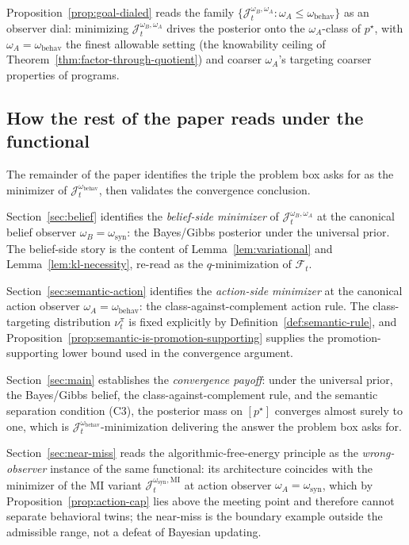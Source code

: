 \documentclass[11pt]{article}
\theoremstyle{definition}
\theoremstyle{remark}
\begin{document}
Proposition~\ref{prop:goal-dialed} reads the family $\{\mathcal J_t^{\omega_B,\omega_A}:\omega_A\le\omega_{\mathrm{behav}}\}$ as an observer dial: minimizing $\mathcal J_t^{\omega_B,\omega_A}$ drives the posterior onto the $\omega_A$-class of $p^\star$, with $\omega_A=\omega_{\mathrm{behav}}$ the finest allowable setting (the knowability ceiling of Theorem~\ref{thm:factor-through-quotient}) and coarser $\omega_A$'s targeting coarser properties of programs.

\subsection{How the rest of the paper reads under the functional}
\label{sec:functional-forward-plan}

The remainder of the paper identifies the triple the problem box asks for as the minimizer of $\mathcal J_t^{\omega_{\mathrm{behav}}}$, then validates the convergence conclusion.

Section~\ref{sec:belief} identifies the \emph{belief-side minimizer} of $\mathcal J_t^{\omega_B,\omega_A}$ at the canonical belief observer $\omega_B=\omega_{\mathrm{syn}}$: the Bayes/Gibbs posterior under the universal prior. The belief-side story is the content of Lemma~\ref{lem:variational} and Lemma~\ref{lem:kl-necessity}, re-read as the $q$-minimization of $\mathcal F_t$.

Section~\ref{sec:semantic-action} identifies the \emph{action-side minimizer} at the canonical action observer $\omega_A=\omega_{\mathrm{behav}}$: the class-against-complement action rule. The class-targeting distribution $\nu_t^\pi$ is fixed explicitly by Definition~\ref{def:semantic-rule}, and Proposition~\ref{prop:semantic-is-promotion-supporting} supplies the promotion-supporting lower bound used in the convergence argument.

Section~\ref{sec:main} establishes the \emph{convergence payoff}: under the universal prior, the Bayes/Gibbs belief, the class-against-complement rule, and the semantic separation condition (C3), the posterior mass on $[p^\star]$ converges almost surely to one, which is $\mathcal J_t^{\omega_{\mathrm{behav}}}$-minimization delivering the answer the problem box asks for.

Section~\ref{sec:near-miss} reads the algorithmic-free-energy principle as the \emph{wrong-observer} instance of the same functional: its architecture coincides with the minimizer of the MI variant $\mathcal J_t^{\omega_{\mathrm{syn}},\mathrm{MI}}$ at action observer $\omega_A=\omega_{\mathrm{syn}}$, which by Proposition~\ref{prop:action-cap} lies above the meeting point and therefore cannot separate behavioral twins; the near-miss is the boundary example outside the admissible range, not a defeat of Bayesian updating.
\end{document}
